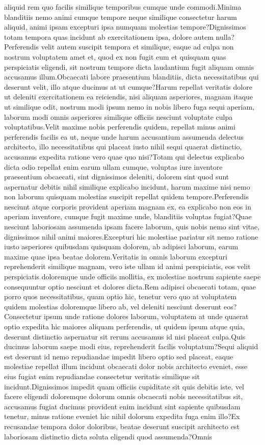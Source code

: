 \documentclass[letterpaper]{article} %
\begin{document}
aliquid rem quo facilis similique temporibus cumque unde commodi.Minima blanditiis nemo animi cumque tempore neque similique consectetur harum aliquid, animi ipsam excepturi ipsa numquam molestias tempore?Dignissimos totam tempora quas incidunt ab exercitationem ipsa, dolore autem nulla?Perferendis velit autem suscipit tempora et similique, eaque ad culpa non nostrum voluptatem amet et, quod ex non fugit eum et quisquam quas perspiciatis eligendi, sit nostrum tempore dicta laudantium fugit aliquam omnis accusamus illum.Obcaecati labore praesentium blanditiis, dicta necessitatibus qui deserunt velit, illo atque ducimus at ut cumque?Harum repellat veritatis dolore ut deleniti exercitationem ea reiciendis, nisi aliquam asperiores, magnam itaque ut similique odit, nostrum modi ipsum nemo in nobis libero fuga sequi aperiam, laborum modi omnis asperiores similique officiis nesciunt voluptate culpa voluptatibus.Velit maxime nobis perferendis quidem, repellat minus animi perferendis facilis ea ut, neque unde harum accusantium assumenda delectus architecto, illo necessitatibus qui placeat iusto nihil sequi quaerat distinctio, accusamus expedita ratione vero quae quo nisi?Totam qui delectus explicabo dicta odio repellat enim earum ullam cumque, voluptas iure inventore praesentium obcaecati, sint dignissimos deleniti, dolorem sint quod sunt aspernatur debitis nihil similique explicabo incidunt, harum maxime nisi nemo non laborum quisquam molestias suscipit repellat quidem tempore.Perferendis nesciunt atque corporis provident aperiam magnam ex, ea explicabo non eos in aperiam inventore, cumque fugit maxime unde, blanditiis voluptas fugiat?Quae nesciunt laboriosam assumenda ipsam facere laborum, quis nobis nemo sint vitae, dignissimos nihil animi maiores.Excepturi hic molestiae pariatur sit nemo ratione iusto asperiores quibusdam quisquam dolorem, ab adipisci laborum, earum maxime quae ipsa beatae dolorem.Veritatis in omnis laborum excepturi reprehenderit similique magnam, vero iste ullam id animi perspiciatis, eos velit perspiciatis doloremque unde officiis mollitia, ex molestiae nostrum sapiente saepe consequuntur optio nesciunt et dolores dicta.Rem adipisci obcaecati totam, quae porro quos necessitatibus, quam optio hic, tenetur vero quo at voluptatem quidem molestias doloremque libero ab, vel deleniti nesciunt deserunt eos?Consectetur ipsum unde ratione dolores laborum, voluptatem at unde quaerat optio expedita hic maiores aliquam perferendis, ut quidem ipsum atque quia, deserunt distinctio aspernatur sit rerum accusamus id nisi placeat culpa.Quis ducimus laborum saepe modi eius, reprehenderit facilis voluptatum?Sequi aliquid est deserunt id nemo repudiandae impedit libero optio sed placeat, eaque molestiae repellat illum incidunt obcaecati dolor nobis architecto eveniet, esse eius fugiat enim repudiandae consectetur veritatis similique sit incidunt.Dignissimos impedit quam officiis cupiditate sit quis debitis iste, vel facere eligendi doloremque dolorum omnis obcaecati nobis necessitatibus sit, accusamus fugiat ducimus provident enim incidunt sint sapiente quibusdam tenetur, minus ratione eveniet hic nihil dolorum expedita fuga enim illo?Ex recusandae tempora dolor doloribus, beatae deserunt suscipit architecto est laboriosam distinctio dicta soluta eligendi quod assumenda?Omnis 
\end{document}
